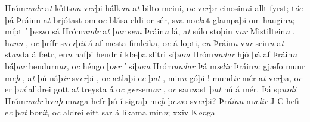 Hróm\textit{undr} a\textit{t} kỏtt\textit{om} v\textit{er}þi hálk\textit{an}
a\textit{t} bilto meini, o\textit{c} v\textit{er}þr einosin\textit{n}i allt
fyrst; t\textit{óc} þá Þráinn  a\textit{t} brjótast om o\textit{c}
blása eldi or   sér, sva no\textit{ck}ot glampaþi om haugin\textit{n}; miþt í
þ\textit{ess}o sá Hróm\textit{undr} a\textit{t} þ\textit{ar} s\textit{em}
Þráin\textit{n} lá, a\textit{t} súlo  stoþin  v\textit{ar}   Mistiltein\textit{n} , h\textit{ann}  , o\textit{c}  þrífr   sv\textit{er}þ\textit{it} á   af mesta fimleika, o\textit{c}  á lopti, e\textit{n} Þráin\textit{n} v\textit{ar} sein\textit{n}
a\textit{t} st\textit{an}da á fætr, en\textit{n} hafþi   hendr í klæþa  slitri   síþ\textit{om} Hróm\textit{undar}  hjó þá af Þráin\textit{n} báþ\textit{ar} hendurn\textit{ar}, o\textit{c}
héngo  þ\textit{ær}  í síþ\textit{om} Hróm\textit{undar} Þá m\textit{ælir} Þráin\textit{n}:  gjæfo munr    m\textit{eþ} , a\textit{t} þú náþ\textit{ir} sv\textit{er}þi  , 
o\textit{c} ætlaþi e\textit{c} þ\textit{at} , min\textit{n} góþi  ! mund\textit{ir} mér a\textit{t}  v\textit{er}þa, o\textit{c} er þ\textit{ví} alldrei gott a\textit{t}
treysta á   o\textit{c} g\textit{er}sem\textit{ar} , 
o\textit{c} san\textit{n}ast þ\textit{at} nú á mér. Þá sp\textit{urdi}
Hróm\textit{undr} hv\textit{aþ} m\textit{ar}ga hefr þú í   sigraþ   m\textit{eþ} þ\textit{ess}o
sv\textit{er}þi? Þr\textit{áinn} m\textit{ælir} J  C   hefi e\textit{c} þ\textit{at} bor\textit{it}, o\textit{c}  aldrei eitt sar á  líkama min\textit{n}; xxiv K\textit{on}ga
